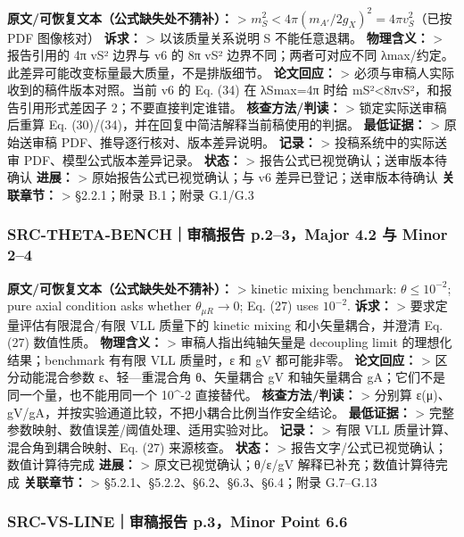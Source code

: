 \documentclass[
]{article}
\begin{document}
\textbf{原文/可恢复文本（公式缺失处不猜补）：} \textgreater{}
\(m_S^2<4\pi(m_{A\prime}/2g_X)^2=4\pi v_S^2\)（已按 PDF 图像核对）
\textbf{诉求：} \textgreater{} 以该质量关系说明 S 不能任意退耦。
\textbf{物理含义：} \textgreater{} 报告引用的 4π vS² 边界与 v6 的 8π vS²
边界不同；两者可对应不同
λmax/约定。此差异可能改变标量最大质量，不是排版细节。
\textbf{论文回应：} \textgreater{}
必须与审稿人实际收到的稿件版本对照。当前 v6 的 Eq. (34) 在 λSmax=4π 时给
mS²\textless8πvS²，和报告引用形式差因子 2；不要直接判定谁错。
\textbf{核查方法/判读：} \textgreater{} 锁定实际送审稿后重算 Eq.
(30)/(34)，并在回复中简洁解释当前稿使用的判据。 \textbf{最低证据：}
\textgreater{} 原始送审稿 PDF、推导逐行核对、版本差异说明。
\textbf{记录：} \textgreater{} 投稿系统中的实际送审
PDF、模型公式版本差异记录。 \textbf{状态：} \textgreater{}
报告公式已视觉确认；送审版本待确认 \textbf{进展：} \textgreater{}
原始报告公式已视觉确认；与 v6 差异已登记；送审版本待确认
\textbf{关联章节：} \textgreater{} §2.2.1；附录 B.1；附录 G.1/G.3

\subsubsection{SRC-THETA-BENCH｜审稿报告 p.2--3，Major 4.2 与 Minor
2--4}\label{src-theta-benchux5ba1ux7a3fux62a5ux544a-p.23major-4.2-ux4e0e-minor-24}

\textbf{原文/可恢复文本（公式缺失处不猜补）：} \textgreater{} kinetic
mixing benchmark: \(\theta\leq10^{-2}\); pure axial condition asks
whether \(\theta_{\mu R}\to0\); Eq. (27) uses \(10^{-2}\).
\textbf{诉求：} \textgreater{} 要求定量评估有限混合/有限 VLL 质量下的
kinetic mixing 和小矢量耦合，并澄清 Eq. (27) 数值性质。
\textbf{物理含义：} \textgreater{} 审稿人指出纯轴矢量是 decoupling limit
的理想化结果；benchmark 有有限 VLL 质量时，ε 和 gV 都可能非零。
\textbf{论文回应：} \textgreater{} 区分动能混合参数 ε、轻---重混合角
θ、矢量耦合 gV 和轴矢量耦合 gA；它们不是同一个量，也不能用同一个
10\^{}-2 直接替代。 \textbf{核查方法/判读：} \textgreater{} 分别算
ε(μ)、gV/gA，并按实验通道比较，不把小耦合比例当作安全结论。
\textbf{最低证据：} \textgreater{}
完整参数映射、数值误差/阈值处理、适用实验对比。 \textbf{记录：}
\textgreater{} 有限 VLL 质量计算、混合角到耦合映射、Eq. (27) 来源核查。
\textbf{状态：} \textgreater{} 报告文字/公式已视觉确认；数值计算待完成
\textbf{进展：} \textgreater{} 原文已视觉确认；θ/ε/gV
解释已补充；数值计算待完成 \textbf{关联章节：} \textgreater{}
§5.2.1、§5.2.2、§6.2、§6.3、§6.4；附录 G.7--G.13

\subsubsection{SRC-VS-LINE｜审稿报告 p.3，Minor Point
6.6}\label{src-vs-lineux5ba1ux7a3fux62a5ux544a-p.3minor-point-6.6}
\end{document}
